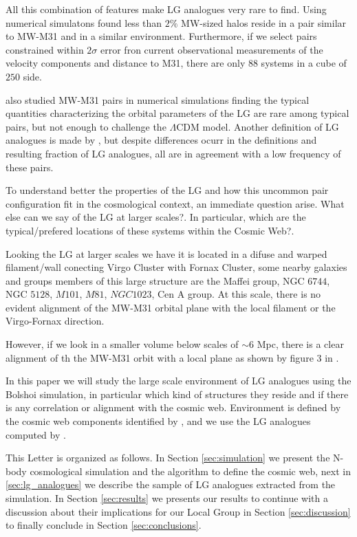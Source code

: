 \documentclass{emulateapj}
\newcommand{\lcdm}{$\Lambda$CDM }
\newcommand{\mpc}{\rm{Mpc}}
\newcommand{\hmpc}{{\ifmmode{h^{-1}{\rm Mpc}}\else{$h^{-1}$Mpc }\fi}}
\begin{document}
All this combination of features make LG analogues very rare to
find. Using numerical simulatons \citet{lganalogues} found less than
$2\%$ MW-sized halos reside in a pair similar to MW-M31 and in a
similar environment. Furthermore, if we select pairs constrained
within $2\sigma$ error fron current observational measurements of the
velocity components and distance to M31, there are only $88$ systems
in a cube of $250$ \hmpc side. 

\citet{2013ApJ...767L...5F} also studied MW-M31 pairs in numerical
simulations finding the typical quantities characterizing the orbital
parameters of the LG are rare among typical pairs, but not enough to
challenge the \lcdm model. 
Another definition of LG analogues is made by
\citet{2008MNRAS.384.1459L}, but despite differences ocurr in the
definitions and resulting fraction of LG analogues, all are in
agreement with a low frequency of these pairs. 

To understand better the properties of the LG and how this uncommon
pair configuration fit in the cosmological context, an immediate
question arise. What else can we say of the LG at larger scales?. In
particular, which are the typical/prefered locations of these systems
within the Cosmic Web?.

Looking the LG at larger scales we have it is located in a difuse and
warped filament/wall conecting Virgo Cluster with Fornax Cluster, some
nearby galaxies and groups members of this large structure are the
Maffei group, NGC $6744$, NGC $5128$, $M101$, $M81$, $NGC1023$, Cen A
group. At this scale, there is no evident alignment of the MW-M31
orbital plane with the local filament or the Virgo-Fornax direction.  

However, if we look in a smaller volume below scales of $\sim 6$ \mpc,
there is a clear alignment of th the MW-M31 orbit with a local plane
as shown by figure $3$ in \citet{2013AJ....146...69C}. 

In this paper we will study the large scale environment of LG
analogues using the Bolshoi simulation, in particular which kind of
structures they reside and if there is any correlation or alignment
with the cosmic web.   Environment is defined by the cosmic web
components identified by \citet{Tweb}, and we use the LG analogues
computed by \citet{lganalogues}. 
 
This Letter is organized as follows. In Section \ref{sec:simulation}
we present the N-body cosmological simulation and the algorithm to
define the cosmic web, next in \ref{sec:lg_analogues} we describe the
sample of LG analogues extracted from the simulation. In
Section \ref{sec:results} we presents our results to continue with a
discussion about their implications for our Local Group in Section
\ref{sec:discussion} to finally conclude in Section
\ref{sec:conclusions}. 
\end{document}
